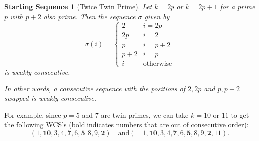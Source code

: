 \documentclass{article}
\newtheorem{startseq}{Starting Sequence}
\theoremstyle{definition}
\theoremstyle{remark}
\numberwithin{equation}{section}
\numberwithin{case}{theorem}
\begin{document}
\begin{startseq}[Twice Twin Prime] \label{start:twin}
    Let $k=2p$ or $k=2p+1$ for a prime $p$ with $p+2$ also prime. Then the sequence $\sigma$ given by 
    $$\sigma(i) = \begin{cases} 
          2 & i = 2p \\
          2p & i = 2 \\
          p & i = p+2 \\
          p+2 & i = p \\
          i & \text{otherwise}
       \end{cases}$$
    is weakly consecutive.
    
    In other words, a consecutive sequence with the positions of $2,2p$ and $p,p+2$ swapped is weakly consecutive.
\end{startseq}


For example, since $p = 5$ and $7$ are twin primes, we can take $k = 10$ or $11$ to get the following WCS's (bold indicates numbers that are out of consecutive order):
\[
  (1,\mathbf{10},3,4,\mathbf{7},6,\mathbf{5},8,9,\mathbf{2}) \quad \text{and} (\quad 1,\mathbf{10},3,4,\mathbf{7},6,\mathbf{5},8,9,\mathbf{2},11).
\]
\end{document}
